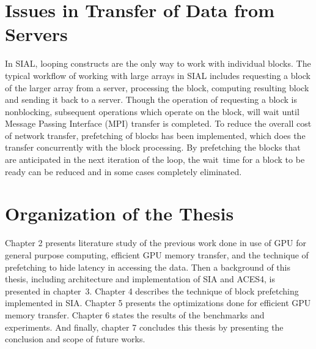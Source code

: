 \section{Issues in Transfer of Data from Servers}
In SIAL, looping constructs are the only way to work with individual blocks.
The typical workflow of working with large arrays in SIAL includes requesting a
block of the larger array from a server,
processing the block, computing resulting block and sending it back to a server. Though
the operation of requesting a block is nonblocking, subsequent operations
which operate on the block, will wait until Message Passing Interface (MPI)
transfer is completed. To reduce the overall cost of network
transfer, prefetching of blocks has been implemented, which does the transfer concurrently
with the block processing. By prefetching the blocks that are anticipated in
the next iteration of the loop, the wait~time for a block to be ready
can be reduced and in some cases completely eliminated.

\section{Organization of the Thesis}
Chapter 2 presents literature study of the previous work done in use of GPU for general purpose
computing, efficient GPU memory transfer, and the technique of prefetching to hide
latency in accessing the data. Then a background of this thesis, including architecture
and implementation of SIA and ACES4, is presented in chapter~3.
Chapter 4 describes the technique of block prefetching implemented in SIA. Chapter 5
presents the optimizations done for efficient GPU memory transfer. Chapter 6 states the
results of the benchmarks and experiments. And
finally, chapter 7 concludes this thesis by presenting the conclusion and scope
of future works.

